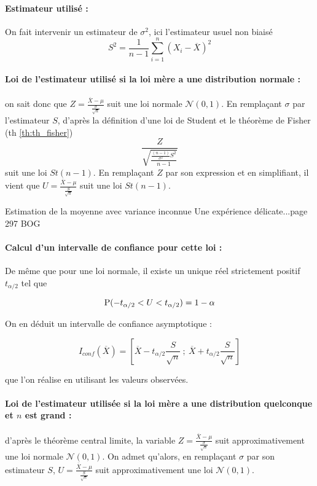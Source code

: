 \paragraph{Estimateur utilisé :} On fait intervenir un estimateur de $\sigma^2$, ici l'estimateur usuel non biaisé $$S^2=\frac{1}{n-1}\sum_{i=1}^n (X_i-\overline{X})^2$$

\paragraph{Loi de l'estimateur utilisé si la loi mère a une distribution normale :} on sait donc que $Z=\frac{\overline{X}-\mu}{\frac{\sigma}{\sqrt{n}}}$ suit une loi normale $\mathcal{N}\left(0,1 \right)$. En remplaçant $\sigma$ par l'estimateur $S$, 
d'après la définition d'une loi de Student et le théorème de Fisher (th \ref{th:th_fisher})
 $$\frac{Z}{\sqrt{\frac{\frac{(n-1)}{\sigma^2}S^2}{n-1}}}$$ suit une loi $St(n-1)$.  En remplaçant $Z$ par son expression et en simplifiant, il vient que $U=\frac{\overline{X}-\mu}{\frac{S}{\sqrt{n}}}$ suit une loi $St(n-1)$.

\begin{exemple}{Estimation de la moyenne avec variance inconnue}{}
Une expérience délicate...page 297 BOG


\end{exemple}

\paragraph{Calcul d'un intervalle de confiance pour cette loi :} De même que pour une loi normale, il existe un unique réel strictement positif $t_{\alpha/2}$ tel que 

$$\operatorname{P}(-t_{\alpha/2} < U < t_{\alpha/2}) = 1-\alpha$$

On en déduit un intervalle de confiance asymptotique :

$$I_{conf}(\overline{X})=\left[\overline{X}-t_{\alpha/2} \frac{S}{\sqrt{n}}~;~\overline{X} + t_{\alpha/2} \frac{S}{\sqrt{n}} \right]$$

que l'on réalise en utilisant les valeurs observées.  

\paragraph{Loi de l'estimateur utilisée si la loi mère a une distribution quelconque et $n$ est grand :} d'après le théorème central limite, la variable  $Z=\frac{\overline{X}-\mu}{\frac{\sigma}{\sqrt{n}}}$ suit approximativement une loi normale $\mathcal{N}\left(0,1 \right)$. On admet qu'alors, en remplaçant $\sigma$ par son estimateur $S$, $U=\frac{\overline{X}-\mu}{\frac{S}{\sqrt{n}}}$ suit approximativement une loi $\mathcal{N}\left(0,1 \right)$.

